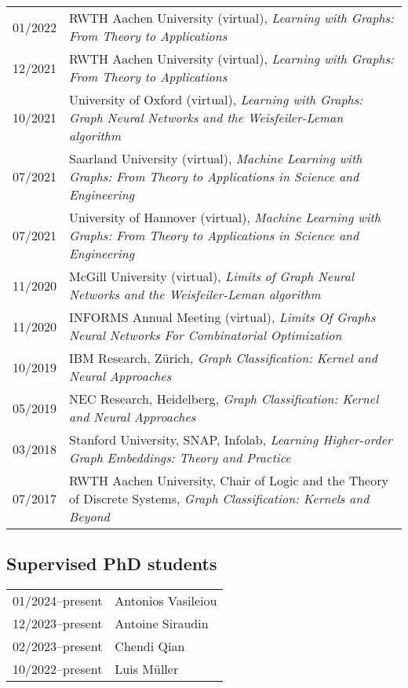 \documentclass[11pt, a4paper, DIV=14, headings=small]{scrartcl}
\begin{document}
\begin{longtabu}{p{2.1cm}p{12.0cm}}
		01/2022 & RWTH Aachen University (virtual), \emph{Learning with Graphs: From Theory to Applications}                                                                                                                                                                                    \\
		12/2021 & RWTH Aachen University (virtual), \emph{Learning with Graphs: From Theory to Applications}                                                                                                                                                                                    \\
		10/2021 & University of Oxford (virtual), \emph{Learning with Graphs: Graph Neural Networks and the Weisfeiler-Leman algorithm}                                                                                                                                                         \\
		07/2021 & Saarland University (virtual), \emph{Machine Learning with Graphs: From Theory to Applications in Science and Engineering} \\
		07/2021 & University of Hannover (virtual), \emph{Machine Learning with Graphs:
			From Theory to Applications in Science and Engineering}                                                                              \\
		11/2020 & McGill University (virtual), \emph{Limits of Graph Neural Networks and the Weisfeiler-Leman algorithm}                     \\
		11/2020 & INFORMS Annual Meeting (virtual), \emph{Limits Of Graphs Neural Networks For Combinatorial Optimization}                   \\
		10/2019 & IBM Research, Zürich, \emph{Graph Classification: Kernel and Neural Approaches}                                            \\
		05/2019 & NEC Research, Heidelberg, \emph{Graph Classification: Kernel and Neural Approaches}                                        \\
		03/2018 & Stanford University, SNAP, Infolab, \emph{Learning Higher-order Graph Embeddings: Theory and Practice}                     \\
		07/2017 & RWTH Aachen University, Chair of Logic and the Theory of Discrete Systems, \emph{Graph Classification: Kernels and Beyond} \\
	\end{longtabu}
	
	\subsection*{Supervised PhD students}
\begin{longtabu}{p{2.1cm}p{12.0cm}}
	01/2024--present & Antonios Vasileiou \\
	12/2023--present & Antoine Siraudin \\
	02/2023--present & Chendi Qian \\
	10/2022--present & Luis Müller \\
\end{longtabu}
\end{document}
